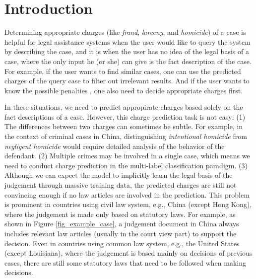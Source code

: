\section{Introduction}
Determining appropriate charges (like \emph{fraud}, \emph{larceny}, and \emph{homicide}) of a case is helpful for legal assistance systems when the user would like to query the system by describing the case, and it is  when the user has no idea of the legal basis of a case, where the only input he (or she) can give is the fact description of the case. 
For example, if the user wants to find similar cases, one can use the predicted charges of the query case to filter out irrelevant results. And if the user wants to know the possible penalties , one also need to decide appropriate charges first.


In these situations, we need to predict appropirate charges based solely on the fact descriptions of a case. 
However, this charge prediction task is not easy:
(1) The differences between two charges can sometimes be subtle. For example, in the context of criminal cases in China, distinguishing \emph{intentional homicide} from \emph{negligent homicide} would require detailed analysis of the behavior of the defendant.
(2) Multiple crimes may be involved in a single case, which means we need to conduct charge prediction in the multi-label classification paradigm. 
(3)  Although we can expect the model to implicitly learn the legal basis of the judgement through massive training data, the predicted charges are still not convincing enough if no law articles are involved in the prediction. This problem is prominent in countries using civil law system, e.g., China (except Hong Kong), where the judgement is made only based on statutory laws. 
For example, as shown in Figure \ref{fig_example_case}, a judgement document in China always includes relevant law articles (usually in the court view part) to support the decision.  
Even in countries using common law system, e.g., the United States (except Louisiana), where the judgement is based mainly on decisions of previous cases, there are still some statutory laws that need to be followed when making decisions. 


